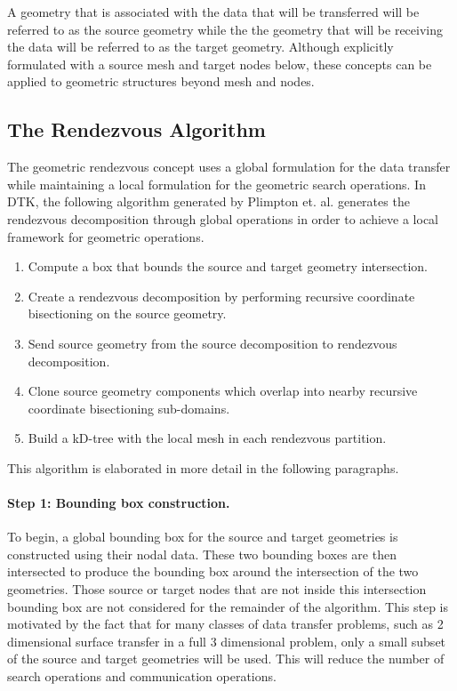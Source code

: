 \documentclass[letterpaper,12pt]{article}
\begin{document}
A geometry that is associated with the data that will be transferred
will be referred to as the source geometry while the the geometry that
will be receiving the data will be referred to as the target
geometry. Although explicitly formulated with a source mesh and target
nodes below, these concepts can be applied to geometric structures
beyond mesh and nodes.

\subsection{The Rendezvous Algorithm}\label{subsec:rendezvous_alg}
The geometric rendezvous concept uses a global formulation for the
data transfer while maintaining a local formulation for the geometric
search operations. In DTK, the following algorithm generated by
Plimpton et. al. \cite{Plimpton_2004} generates the rendezvous
decomposition through global operations in order to achieve a local
framework for geometric operations. 

\begin{enumerate}
\item Compute a box that bounds the source and target geometry
  intersection.
\item Create a rendezvous decomposition by performing recursive
  coordinate bisectioning on the source geometry.
\item Send source geometry from the source decomposition to rendezvous
  decomposition.
\item Clone source geometry components which overlap into nearby
  recursive coordinate bisectioning sub-domains.
\item Build a kD-tree with the local mesh in each rendezvous
  partition.
\end{enumerate}

This algorithm is elaborated in more detail in the following
paragraphs.

\paragraph{Step 1: Bounding box construction.}
To begin, a global bounding box for the source and target geometries
is constructed using their nodal data. These two bounding boxes are
then intersected to produce the bounding box around the intersection
of the two geometries. Those source or target nodes that are not
inside this intersection bounding box are not considered for the
remainder of the algorithm. This step is motivated by the fact that
for many classes of data transfer problems, such as 2 dimensional
surface transfer in a full 3 dimensional problem, only a small subset
of the source and target geometries will be used. This will reduce the
number of search operations and communication operations.
\end{document}
